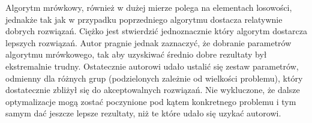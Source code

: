 \documentclass[polish,polish,a4paper]{article}
\begin{document}
\par Algorytm mrówkowy, również w dużej mierze polega na elementach losowości, jednakże tak jak w przypadku poprzedniego algorytmu dostacza relatywnie dobrych rozwiązań.
Ciężko jest stwierdzić jednoznacznie który algorytm dostarcza lepszych rozwiązań. Autor pragnie jednak zaznaczyć, że dobranie parametrów algorytmu mrówkowego, tak aby uzyskiwać
średnio dobre rezultaty był ekstremalnie trudny. Ostatecznie autorowi udało ustalić się zestaw parametrów, odmienny dla różnych grup (podzielonych zależnie od wielkości problemu),
który dostatecznie zbliżył się do akceptowalnych rozwiązań. Nie wykluczone, że dalsze optymalizacje mogą zostać poczynione pod kątem konkretnego problemu i tym samym dać jeszcze lepsze
rezultaty, niż te które udało się uzykać autorowi.



\end{document}
